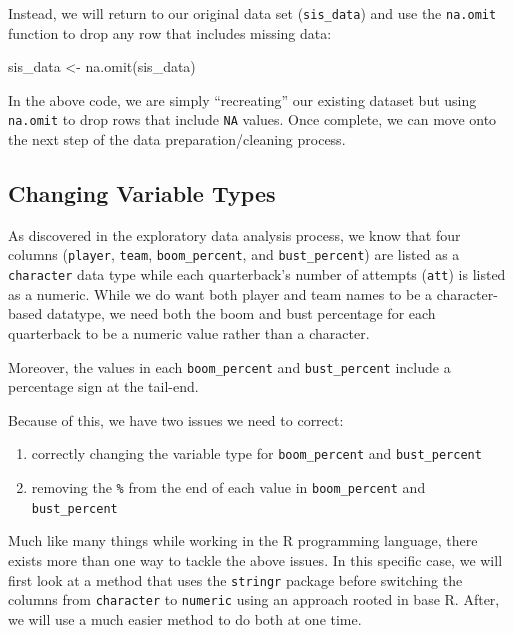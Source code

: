 \documentclass[
  letterpaper,
]{krantz}
\newenvironment{Shaded}{\begin{snugshade}}{\end{snugshade}}
\newcommand{\FunctionTok}[1]{\textcolor[rgb]{0.28,0.35,0.67}{#1}}
\newcommand{\NormalTok}[1]{\textcolor[rgb]{0.00,0.23,0.31}{#1}}
\newcommand{\OtherTok}[1]{\textcolor[rgb]{0.00,0.23,0.31}{#1}}
\providecommand{\tightlist}{%
  \setlength{\itemsep}{0pt}\setlength{\parskip}{0pt}}\usepackage{longtable,booktabs,array}
\begin{document}
Instead, we will return to our original data set (\texttt{sis\_data})
and use the \texttt{na.omit} function to drop any row that includes
missing data:

\begin{Shaded}
\begin{Highlighting}[]
\NormalTok{sis\_data }\OtherTok{\textless{}{-}} \FunctionTok{na.omit}\NormalTok{(sis\_data)}
\end{Highlighting}
\end{Shaded}

In the above code, we are simply ``recreating'' our existing dataset but
using \texttt{na.omit} to drop rows that include \texttt{NA} values.
Once complete, we can move onto the next step of the data
preparation/cleaning process.

\hypertarget{changing-variable-types}{%
\subsection{Changing Variable Types}\label{changing-variable-types}}

As discovered in the exploratory data analysis process, we know that
four columns (\texttt{player}, \texttt{team}, \texttt{boom\_percent},
and \texttt{bust\_percent}) are listed as a \texttt{character} data type
while each quarterback's number of attempts (\texttt{att}) is listed as
a numeric. While we do want both player and team names to be a
character-based datatype, we need both the boom and bust percentage for
each quarterback to be a numeric value rather than a character.

Moreover, the values in each \texttt{boom\_percent} and
\texttt{bust\_percent} include a percentage sign at the tail-end.

Because of this, we have two issues we need to correct:

\begin{enumerate}
\def\labelenumi{\arabic{enumi}.}
\tightlist
\item
  correctly changing the variable type for \texttt{boom\_percent} and
  \texttt{bust\_percent}
\item
  removing the \texttt{\%} from the end of each value in
  \texttt{boom\_percent} and \texttt{bust\_percent}
\end{enumerate}

Much like many things while working in the R programming language, there
exists more than one way to tackle the above issues. In this specific
case, we will first look at a method that uses the \texttt{stringr}
package before switching the columns from \texttt{character} to
\texttt{numeric} using an approach rooted in base R. After, we will use
a much easier method to do both at one time.
\end{document}
